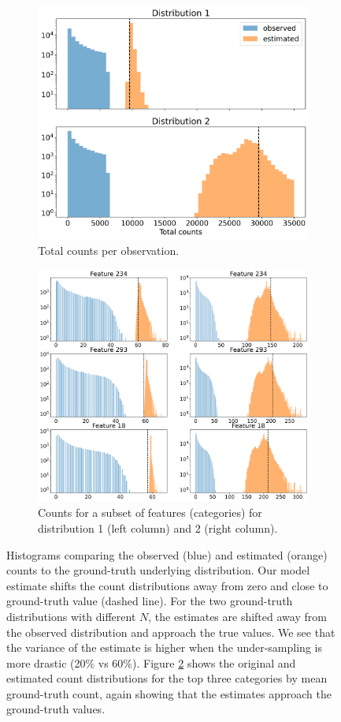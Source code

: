 \documentclass{article}
\theoremstyle{plain}
\theoremstyle{definition}
\theoremstyle{remark}
\begin{document}
\begin{figure}[h]
     \centering
     \begin{subfigure}{\columnwidth}
         \centering
         \includegraphics[width=0.5\columnwidth]{vae_total_counts.png}
         \caption{Total counts per observation.}
         \label{fig:vae_total_counts}
     \end{subfigure}
     \vfill
     \begin{subfigure}{\columnwidth}
         \centering
         \includegraphics[width=0.5\columnwidth]{vae_feature_counts.png}
         \caption{Counts for a subset of features (categories) for distribution 1 (left column) and 2 (right column).}
         \label{fig:vae_feature_counts}
     \end{subfigure}
     \caption{Histograms comparing the observed (blue) and estimated (orange) counts to the ground-truth underlying distribution. Our model estimate shifts the count distributions away from zero and close to ground-truth value (dashed line). For the two ground-truth distributions with different $N$, the estimates are shifted away from the observed distribution and approach the true values. We see that the variance of the estimate is higher when the under-sampling is more drastic (20\% vs 60\%). Figure \ref{fig:vae_feature_counts} shows the original and estimated count distributions for the top three categories by mean ground-truth count, again showing that the estimates approach the ground-truth values.}
     \label{fig:vae_total}
\end{figure}
\end{document}

